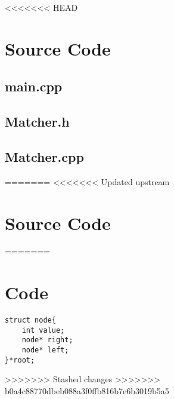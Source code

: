 <<<<<<< HEAD
\section{Source Code}



\subsection{main.cpp}
\label{app:main_cpp}

\bigskip
\bigskip

\subsection{Matcher.h}
\label{app:matcher_h}

\bigskip
\bigskip

\subsection{Matcher.cpp}
\label{app:matcher_cpp}

\bigskip
\bigskip
=======
<<<<<<< Updated upstream
\section{Source Code}
=======
\section{Code}

\begin{lstlisting}
struct node{
    int value;
    node* right;
    node* left;
}*root;
\end{lstlisting}
>>>>>>> Stashed changes
>>>>>>> b0a4c88770dbeb088a3f0ffb816b7e6b3019b5a5
